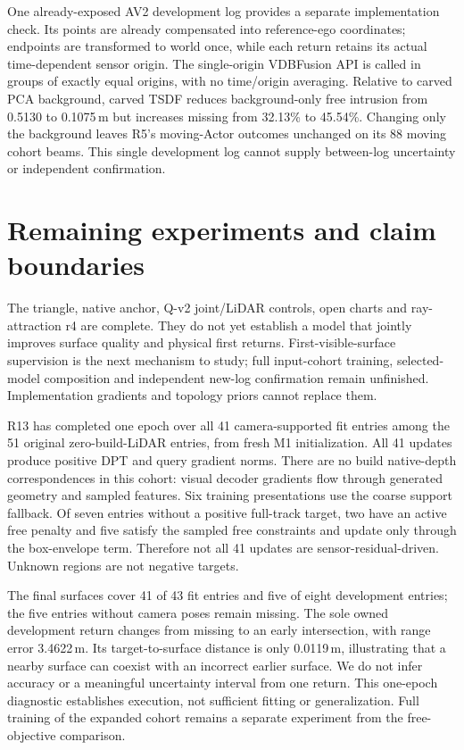 \documentclass[10pt,a4paper]{article}
\begin{document}
One already-exposed AV2 development log provides a separate implementation
check. Its points are already compensated into reference-ego coordinates;
endpoints are transformed to world once, while each return retains its actual
time-dependent sensor origin. The single-origin VDBFusion API is called in
groups of exactly equal origins, with no time/origin averaging. Relative to
carved PCA background, carved TSDF reduces background-only free intrusion from
0.5130 to 0.1075\,m but increases missing from 32.13\% to 45.54\%. Changing only
the background leaves R5's moving-Actor outcomes unchanged on its 88 moving
cohort beams. This single development log cannot supply between-log uncertainty
or independent confirmation.

\section{Remaining experiments and claim boundaries}\label{sec:limits}
The triangle, native anchor, Q-v2 joint/LiDAR controls, open charts and
ray-attraction r4 are complete. They do not yet establish a model that jointly
improves surface quality and physical first returns. First-visible-surface
supervision is the next mechanism to study; full input-cohort training,
selected-model composition and independent new-log confirmation remain
unfinished. Implementation gradients and topology priors cannot replace them.

R13 has completed one epoch over all 41 camera-supported fit entries among
the 51 original zero-build-LiDAR entries, from fresh M1 initialization. All
41 updates produce positive DPT and query gradient norms. There are no build
native-depth correspondences in this cohort: visual decoder gradients flow
through generated geometry and sampled features. Six training presentations
use the coarse support fallback. Of seven entries without a positive full-track
target, two have an active free penalty and five satisfy the sampled free
constraints and update only through the box-envelope term. Therefore not all
41 updates are sensor-residual-driven. Unknown regions are not negative targets.

The final surfaces cover 41 of 43 fit entries and five of eight development
entries; the five entries without camera poses remain missing. The sole owned
development return changes from missing to an early intersection, with range
error 3.4622\,m. Its target-to-surface distance is only 0.0119\,m, illustrating
that a nearby surface can coexist with an incorrect earlier surface. We do
not infer accuracy or a meaningful uncertainty interval from one return.
This one-epoch diagnostic establishes execution, not sufficient fitting or
generalization. Full training of the expanded cohort remains a separate
experiment from the free-objective comparison.
\end{document}
